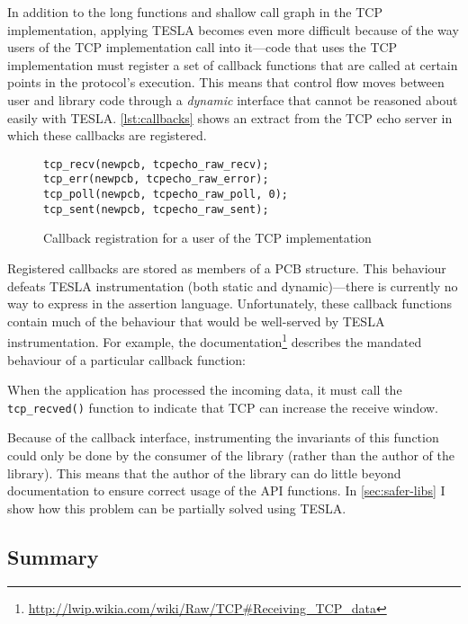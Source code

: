 In addition to the long functions and shallow call graph in the TCP
implementation, applying TESLA becomes even more difficult because of the way
users of the TCP implementation call into it---code that uses the TCP
implementation must register a set of callback functions that are called at
certain points in the protocol's execution. This means that control flow moves
between user and library code through a \emph{dynamic} interface that cannot be
reasoned about easily with TESLA. \autoref{lst:callbacks} shows an extract from the TCP
echo server in which these callbacks are registered.

\begin{figure}
  \begin{verbatim}
tcp_recv(newpcb, tcpecho_raw_recv);
tcp_err(newpcb, tcpecho_raw_error);
tcp_poll(newpcb, tcpecho_raw_poll, 0);
tcp_sent(newpcb, tcpecho_raw_sent);
  \end{verbatim}
  \caption{Callback registration for a user of the \lwip{} TCP implementation}
  \label{lst:callbacks}
\end{figure}

Registered callbacks are stored as members of a PCB structure. This
behaviour defeats TESLA instrumentation (both static and
dynamic)---there is currently no way to express  in the assertion language.
Unfortunately, these callback functions contain much of the behaviour
that would be well-served by TESLA instrumentation. For example, the
\lwip{}
documentation\footnote{\url{http://lwip.wikia.com/wiki/Raw/TCP\#Receiving_TCP_data}}
describes the mandated behaviour of a particular callback function:

\begin{displayquote}
When the application has processed the incoming data, it must call the
\texttt{tcp_recved()} function to indicate that TCP can increase
the receive window.
\end{displayquote}

Because of the callback interface, instrumenting the invariants of this
function could only be done by the consumer of the library (rather than
the author of the library). This means that the author of the library
can do little beyond documentation to ensure correct usage of the API
functions. In \autoref{sec:safer-libs} I show how this problem can be partially
solved using TESLA.

\subsection{Summary}

